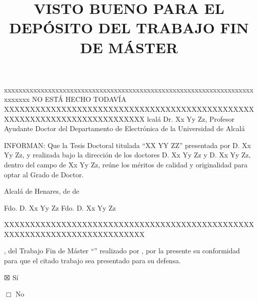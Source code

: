 %

\title{VISTO BUENO \MakeUppercase{\mybookDelOrDeLos{}
    \mybookTutorOrTutores} PARA EL DEPÓSITO DEL TRABAJO FIN DE MÁSTER} 
\date{}                                            %


{\Large
\maketitle 

\thispagestyle{empty}

\vspace{1cm}


xxxxxxxxxxxxxxxxxxxxxxxxxxxxxxxxxxxxxxxxxxxxxxxxxxxxxxxxxxxxxxxxxxxxxxxxxxx
NO ESTÁ HECHO TODAVÍA
XXXXXXXXXXXXXXXXXXXXXXXXXXXXXXXXXXXXXXXXXXXXXXXXXXXXXXXXXXXXXXXXXXXXXXXXXXX
lcalá
Dr. Xx Yy Zz, Profesor Ayudante Doctor del Departamento de Electrónica de la Universidad de Alcalá




INFORMAN: Que la Tesis Doctoral titulada ``XX YY ZZ'' presentada por D. Xx
Yy Zz, y realizada bajo la dirección de los doctores D. Xx Yy Zz y D. Xx
Yy Zz, dentro del campo de Xx Yy Zz, reúne los méritos de calidad y
originalidad para optar al Grado de Doctor.


	Alcalá de Henares,          de                      de 






	Fdo. D.  Xx Yy Zz                                       Fdo. D.  Xx Yy Zz

XXXXXXXXXXXXXXXXXXXXXXXXXXXXXXXXXXXXXXXXXXXXXXXXXXXXXXXXXXXXXXXXXXXXXXXXXXX

\mybookadvisorsConDon, \mybookTutorOrTutores{} del Trabajo Fin de Máster
``\mybooktitle'' realizado por \donOrDonaAutor{} \myAuthorFullName, por la
presente \mybookDaOrDan{} su conformidad para que el citado trabajo sea
presentado para su defensa.

\vspace{1cm}

$\XBox$ Sí

\vspace{0.5cm}

$\Box$ No

\vspace{2cm}


\vspace{4cm}


}


